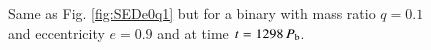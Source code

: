 \documentclass{aa}
\begin{document}
\begin{appendix}
\begin{figure}
\begin{center}
    \caption{ Same as Fig. \ref{fig:SEDe0q1} but for a binary with  mass ratio $q=0.1$ and eccentricity $e=0.9$ and at time $t = 1298 \, P_{\rm b}$.}
    \label{fig:SEDe09q01}
    \end{center}
\end{figure}

\end{appendix}
\end{document}

